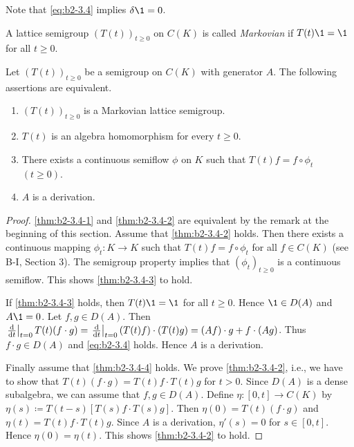 Note that \eqref{eq:b2-3.4} implies $\delta\1 = 0$.

A lattice semigroup $(T(t))_{t \geq 0}$ on $C(K)$ is called \emph{Markovian} if $T(t)\1 = \1$ for all $t \geq 0$.

\begin{theorem}\label{thm:b2-3.4}
Let $(T(t))_{t \geq 0}$ be a semigroup on $C(K)$ with generator $A$.
The following assertions are equivalent.
\begin{enumerate}[\upshape (a)]
\item \label{thm:b2-3.4-1}
$(T(t))_{t \geq 0}$ is a Markovian lattice semigroup.
\item \label{thm:b2-3.4-2}
$T(t)$ is an algebra homomorphism for every $t \geq 0$.
\item \label{thm:b2-3.4-3}
There exists a continuous semiflow $\phi$ on $K$ such that $T(t)f = f \circ \phi_{t}$ $(t \geq 0)$.
\item \label{thm:b2-3.4-4}
$A$ is a derivation.
\end{enumerate}
\end{theorem}

\begin{proof}
\ref{thm:b2-3.4-1} and \ref{thm:b2-3.4-2} are equivalent by the remark at the beginning of this section.
Assume that \ref{thm:b2-3.4-2} holds.
Then there exists a continuous mapping $\phi_{t} \colon K \to K$ such that $T(t)f = f \circ \phi_{t}$ for all $f \in C(K)$ (see B-I, Section 3).
The semigroup property implies that $(\phi_{t})_{t \geq 0}$ is a continuous semiflow.
This shows \ref{thm:b2-3.4-3}  to hold.

If \ref{thm:b2-3.4-3} holds, then $T(t)\1 = \1$ for all $t \geq 0$. Hence $\1 \in D(A)$ and $A\1 = 0$.
Let $f,g \in D(A)$.
Then $\left.\frac{\mathop{}\!\mathrm{d}{}}{\mathop{}\!\mathrm{d}{t}}\right|_{t=0} T(t)(f \cdot g) = \left.\frac{\mathop{}\!\mathrm{d}{}}{\mathop{}\!\mathrm{d}{t}}\right|_{t=0} (T(t)f) \cdot (T(t)g) = (Af) \cdot g + f \cdot (Ag)$.
Thus $f \cdot g \in D(A)$ and \eqref{eq:b2-3.4} holds.
Hence $A$ is a derivation.

Finally assume that \ref{thm:b2-3.4-4} holds.
We prove \ref{thm:b2-3.4-2}, i.e., we have to show that $T(t)(f \cdot g) = T(t)f \cdot T(t)g$ for $t > 0$.
Since $D(A)$ is a dense subalgebra, we can assume that $f,g \in D(A)$.
Define $\eta \colon [0,t] \to C(K)$ by $\eta(s) \coloneqq T(t-s)[T(s)f \cdot T(s)g]$.
Then $\eta(0) = T(t)(f \cdot g)$ and $\eta(t) = T(t)f \cdot T(t)g$.
Since $A$ is a derivation, $\eta'(s) = 0$ for $s \in [0,t]$.
Hence $\eta(0) = \eta(t)$.
This shows \ref{thm:b2-3.4-2} to hold.
\end{proof}

